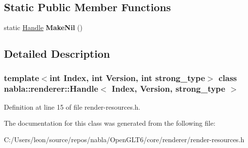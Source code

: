 \subsection*{Static Public Member Functions}
\begin{DoxyCompactItemize}
\item 
\mbox{\label{classnabla_1_1renderer_1_1_handle_a4332bb95d270c546cf588f06ed795b83}} 
static \mbox{\hyperlink{classnabla_1_1renderer_1_1_handle}{Handle}} {\bfseries Make\+Nil} ()
\end{DoxyCompactItemize}


\subsection{Detailed Description}
\subsubsection*{template$<$int Index, int Version, int strong\+\_\+type$>$\newline
class nabla\+::renderer\+::\+Handle$<$ Index, Version, strong\+\_\+type $>$}



Definition at line 15 of file render-\/resources.\+h.



The documentation for this class was generated from the following file\+:\begin{DoxyCompactItemize}
\item 
C\+:/\+Users/leon/source/repos/nabla/\+Open\+G\+L\+T6/core/renderer/render-\/resources.\+h\end{DoxyCompactItemize}
